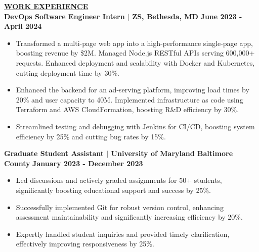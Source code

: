 \documentclass{article}
\begin{document}
\vspace{2mm} 

\noindent \textbf{\underline{WORK EXPERIENCE}} \\
\noindent \textbf{DevOps Software Engineer Intern $\mid$ ZS, Bethesda, MD}  \hfill \textbf{June 2023 - April 2024}
\begin{itemize}[noitemsep,nolistsep,leftmargin=*]
\item {\small Transformed a multi-page web app into a high-performance single-page app, boosting revenue by \$2M. Managed Node.js RESTful APIs serving 600,000+ requests. Enhanced deployment and scalability with Docker and Kubernetes, cutting deployment time by 30\%.}
\item {\small Enhanced the backend for an ad-serving platform, improving load times by 20\% and user capacity to 40M. Implemented infrastructure as code using Terraform and AWS CloudFormation, boosting R&D efficiency by 30\%.}
\item {\small Streamlined testing and debugging with Jenkins for CI/CD, boosting system efficiency by 25\% and cutting bug rates by 15\%.}
\end{itemize}

\vspace{2mm} 

\noindent \textbf{Graduate Student Assistant $\mid$ University of Maryland Baltimore County}  \hfill \textbf{January 2023 - December 2023}
\begin{itemize}[noitemsep,nolistsep,leftmargin=*]
\item {\small Led discussions and actively graded assignments for 50+ students, significantly boosting educational support and success by 25\%.}
\item {\small Successfully implemented Git for robust version control, enhancing assessment maintainability and significantly increasing efficiency by 20\%.}
\item {\small Expertly handled student inquiries and provided timely clarification, effectively improving responsiveness by 25\%.}
\end{itemize}

\vspace{2mm} 
\end{document}

